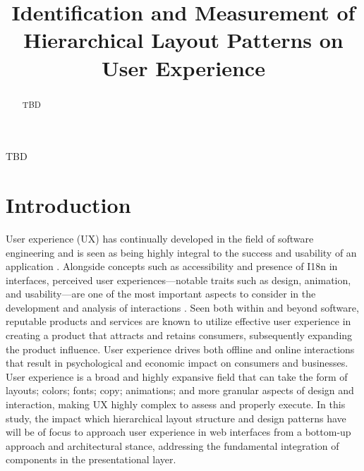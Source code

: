 \documentclass[conference]{IEEEtran}
\begin{document}
\title{Identification and Measurement of Hierarchical Layout Patterns on User Experience\\
}

\author{
}

\maketitle

\begin{abstract}
TBD
\end{abstract}

\begin{IEEEkeywords}
TBD
\end{IEEEkeywords}

\section{Introduction}
User experience (UX) has continually developed in the field of software engineering and is seen as being highly integral to the success and usability of an application \cite{10.1016/j.jvlc.2017.08.004}. Alongside concepts such as accessibility and presence of I18n in interfaces, perceived user experiences—notable traits such as design, animation, and usability—are one of the most important aspects to consider in the development and analysis of interactions \cite{benchmarking}. Seen both within and beyond software, reputable products and services are known to utilize effective user experience in creating a product that attracts and retains consumers, subsequently expanding the product influence. User experience drives both offline and online interactions that result in psychological and economic impact on consumers and businesses. User experience is a broad and highly expansive field that can take the form of layouts; colors; fonts; copy; animations; and more granular aspects of design and interaction, making UX highly complex to assess and properly execute. In this study, the impact which hierarchical layout structure and design patterns have will be of focus to approach user experience in web interfaces from a bottom-up approach and architectural stance, addressing the fundamental integration of components in the presentational layer.
\end{document}
